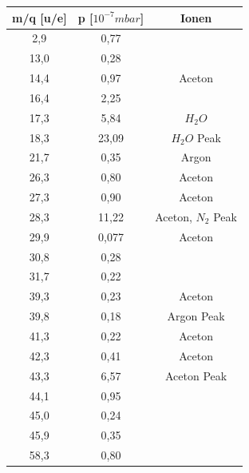 
\begin{center}
\begin{tabular}{c|c|c}
m/q [u/e] & p [$10^{-7} mbar$] & Ionen\\	
\hline	
2,9 &	0,77 &\\
13,0 &	0,28 &\\
14,4 &	0,97 & Aceton\\
16,4 &	2,25 &\\
17,3 &	5,84 & $H_2O$\\
18,3 &	23,09 & $H_2O$ Peak\\
21,7 &	0,35 & Argon\\
26,3 &	0,80 & Aceton\\
27,3 &	0,90 & Aceton\\
28,3 &	11,22 & Aceton, $N_2$ Peak\\
29,9 &	0,077 & Aceton\\
30,8 &	0,28 &\\
31,7 &	0,22 &\\
39,3 &	0,23 & Aceton\\
39,8 &	0,18 & Argon Peak\\
41,3 &	0,22 & Aceton\\
42,3 &	0,41 & Aceton\\
43,3 &	6,57 & Aceton Peak\\
44,1 &	0,95 &\\
45,0 &	0,24 &\\
45,9 &	0,35 &\\
58,3 &	0,80 &\\
\end{tabular}
\end{center}


